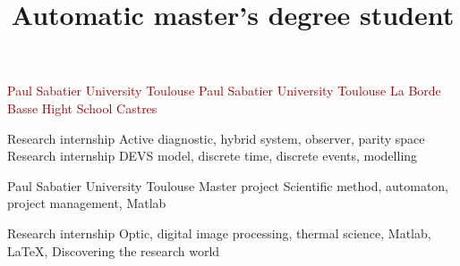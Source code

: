 \documentclass[11pt,a4paper,sans]{moderncv}        %
\title{\huge Automatic master's degree student} %
\begin{document}
\begin{samepage}
\makecvtitle
\vspace{-1.3cm}%
\noindent\begin{minipage}[t]{.44\textwidth}%
\vspace*{-3mm}%
{\textcolor{darkred}{Paul Sabatier University}}%
{\textcolor{darkred}{Toulouse}}%
%
{\textcolor{darkred}{Paul Sabatier University}}%
{\textcolor{darkred}{Toulouse}}%
%
{\textcolor{darkred}{La Borde Basse Hight School}}%
{\textcolor{darkred}{Castres}}%
\end{minipage}\hfill%
\noindent\begin{minipage}[t]{.51\textwidth}
%
{Research internship}%
{Active diagnostic, hybrid system, observer, parity space}%
%
{Research internship}%
{DEVS model, discrete time, discrete events, modelling}%

%
{Paul Sabatier University}%
{Toulouse}%
{Master project}%
{Scientific method, automaton, project management, Matlab}%

%
{Research internship}%
{Optic, digital image processing, thermal science, Matlab, \LaTeX , Discovering the research world}%


\end{minipage}
\end{samepage}
\end{document}
